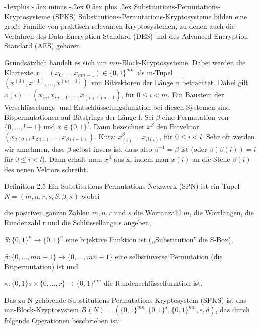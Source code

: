 \documentclass[a4paper]{article}
\makeatletter
\renewcommand{\subsection}{\@startsection{subsection}{2}{0mm}%
 {-1explus -.5ex minus -.2ex}%
 {0.5ex plus .2ex}%
 {\normalfont\normalsize\bfseries}}
\makeatother
\begin{document}
\begin{multicols}{3}
    \subsection{Substitutions-Permutations-Kryptosysteme (SPKS)}
    Substitutions-Permutations-Kryptosysteme bilden eine große Familie von praktisch relevanten Kryptosystemen, zu denen auch die Verfahren des Data Encryption Standard (DES) und des Advanced Encryption Standard (AES) gehören.

    Grundsätzlich handelt es sich um $mn$-Block-Kryptosysteme. Dabei werden die Klartexte $x=(x_0,...,x_{mn-1})\in\{ 0,1\}^{mn}$ als m-Tupel $(x^{(0)},x^{(1)},...,x^{(m-1)})$ von Bitvektoren der Länge n betrachtet. Dabei gilt $x(i)=(x_{in},x_{in+1},...,x_{(i+1)n-1})$, für $0\leq i<m$.
    Ein Baustein der Verschlüsselungs- und Entschlüsselungsfunktion bei diesen Systemen sind Bitpermutationen  auf Bitstrings der Länge l: Sei $\beta$ eine Permutation von $\{0,...,l-1\}$ und $x\in\{0,1\}^l$. Dann bezeichnet $x^{\beta}$ den Bitvektor $(x_{{\beta}(0)},x_{{\beta}(1)},...,x_{{\beta}(l-1)})$. Kurz: $x^{\beta}_{(i)}=x_{{\beta}(i)}$, für $0\leq i<l$.
    Sehr oft werden wir annehmen, dass $\beta$ selbst invers ist, dass also ${\beta}^{-1}=\beta$ ist (oder ${\beta}({\beta}(i))=i$ für $0\leq i<l$). Dann erhält man $x^{\beta}$ aus x, indem man $x(i)$ an die Stelle ${\beta}(i)$ des neuen Vektors schreibt.

    Definition 2.5 Ein Substitutions-Permutations-Netzwerk (SPN) ist ein Tupel $N=(m,n,r,s,S,\beta,\kappa)$ wobei
    \begin{itemize*}
        \item die positiven ganzen Zahlen $m,n,r$ und $s$ die Wortanzahl $m$, die Wortlängen, die Rundenzahl r und die Schlüssellänge s angeben,
        \item $S:\{0,1\}^n\rightarrow\{0,1\}^n$ eine bijektive Funktion ist (,,Substitution'',die S-Box),
        \item ${\beta}:\{0,...,mn-1\}\rightarrow\{0,...,mn-1\}$ eine selbstinverse Permutation (die Bitpermutation) ist und
        \item $\kappa :\{0,1\}s\times\{0,...,r\}\rightarrow\{0,1\}^{mn}$ die Rundenschlüsselfunktion ist.
    \end{itemize*}

    Das zu N gehörende Substitutions-Permutations-Kryptosystem (SPKS) ist das mn-Block-Kryptosystem $B(N)=(\{0,1\}^{mn},\{0,1\}^s,\{0,1\}^{mn},e,d)$, das durch folgende Operationen beschrieben ist:


\end{multicols}
\end{document}
